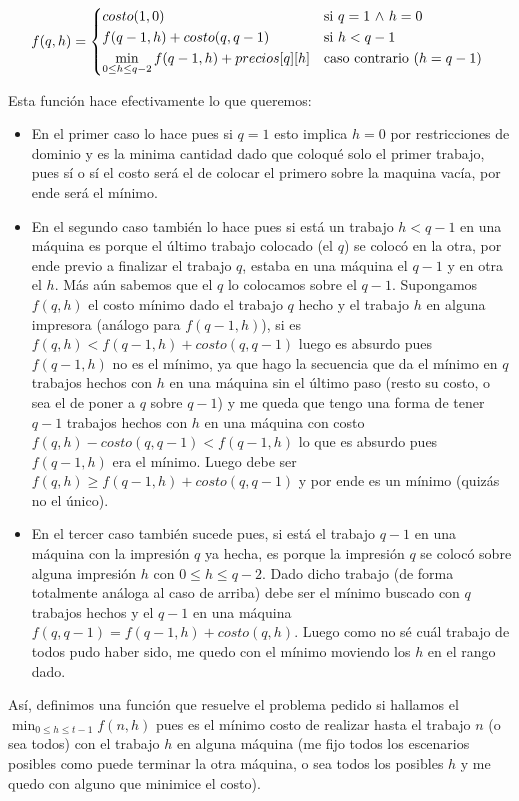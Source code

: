\documentclass[A4paper,oneside,fleqn,11pt]{article}
\theoremstyle{definition}
\begin{document}
\begin{equation}
    f(q,h) =
    \begin{cases*}
       costo(1,0) & si  $q=1$  $\land$  $h=0 $\\
       f(q-1,h)+costo(q,q-1) & si  $h < q-1 $\\
       \displaystyle \min_{0 \leq h \leq q-2} {f(q-1,h)+precios[q][h]}       & caso contrario ($h=q-1$)
    \end{cases*}
  \end{equation}

Esta función hace efectivamente lo que queremos:
\begin{itemize}

 \item En el primer caso lo hace pues si $q=1$ esto implica $h=0$ por restricciones de dominio y es la minima cantidad dado que coloqué solo el primer trabajo, pues sí o sí el costo será el de colocar el primero sobre la maquina vacía, por ende será el mínimo.
 \item En el segundo caso también lo hace pues si está un trabajo $h<q-1$ en una máquina es porque el último trabajo colocado (el $q$) se colocó en la otra, por ende previo a finalizar el trabajo $q$, estaba en una máquina el $q-1$ y en otra el $h$. Más aún sabemos que el $q$ lo colocamos sobre el $q-1$. Supongamos $f(q,h)$ el costo mínimo dado el trabajo $q$ hecho y el trabajo $h$ en alguna impresora (análogo para $f(q-1,h)$), si es $f(q,h)<f(q-1,h)+costo(q,q-1)$ luego es absurdo pues $f(q-1,h)$ no es el mínimo, ya que hago la secuencia que da el mínimo en $q$ trabajos hechos con $h$ en una máquina sin el último paso (resto su costo, o sea el de poner a $q$ sobre $q-1$) y me queda que tengo una forma de tener $q-1$ trabajos hechos con $h$ en una máquina con costo $f(q,h)-costo(q,q-1)<f(q-1,h)$ lo que es absurdo pues $f(q-1,h)$ era el mínimo. Luego debe ser $f(q,h) \geq f(q-1,h)+costo(q,q-1)$ y por ende es un mínimo (quizás no el único).
 \item En el tercer caso también sucede pues, si está el trabajo $q-1$ en una máquina con la impresión $q$ ya hecha, es porque la impresión $q$ se colocó sobre alguna impresión $h$ con $0 \leq h \leq q-2$. Dado dicho trabajo (de forma totalmente análoga al caso de arriba) debe ser el mínimo buscado con $q$ trabajos hechos y el $q-1$ en una máquina $f(q,q-1)= f(q-1,h)+costo(q,h)$. Luego como no sé cuál trabajo de todos pudo haber sido, me quedo con el mínimo moviendo los $h$ en el rango dado.
  \end{itemize}
Así, definimos una función que resuelve el problema pedido si hallamos el $\displaystyle \min_{0 \leq h \leq t-1} {f(n,h)}  $ pues es el mínimo costo de realizar hasta el trabajo $n$ (o sea todos) con el trabajo $h$ en alguna máquina (me fijo todos los escenarios posibles como puede terminar la otra máquina, o sea todos los posibles $h$ y me quedo con alguno que minimice el costo). 
\end{document}
